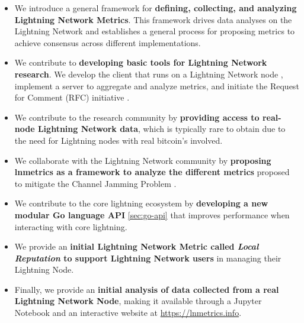 \begin{itemize}
  \item We introduce a general framework for \textbf{defining, collecting, and analyzing Lightning Network Metrics}.
        This framework drives data analyses on the Lightning Network and establishes a general process for proposing metrics
        to achieve consensus across different implementations.
  \item We contribute to \textbf{developing basic tools for Lightning Network research}. We develop the client that runs
        on a Lightning Network node \cite{lnmetrics-client}, implement a server \cite{lnmetrics-server} to aggregate and
        analyze metrics, and initiate the Request for Comment (RFC) initiative \cite{lnmetrics-rfc}.
  \item We contribute to the research community by \textbf{providing access to real-node Lightning Network data},
        which is typically rare to obtain due to the need for Lightning nodes with real bitcoin's involved.
  \item We collaborate with the Lightning Network community \cite{lightning-network-ml-post-on-jamming} by \textbf{proposing
        lnmetrics as a framework to analyze the different metrics} proposed to mitigate the Channel Jamming Problem \cite{cryptoeprint:2022/1454}.
  \item We contribute to the core lightning ecosystem by \textbf{developing a new modular Go language API} \ref{sec:go-api}
        that improves performance when interacting with core lightning.
  \item We provide an \textbf{initial Lightning Network Metric called \emph{Local Reputation} \cite{lnmetrics_localreputation}
        to support Lightning Network users} in managing their Lightning Node.
  \item Finally, we provide an \textbf{initial analysis of data collected from a real Lightning Network Node}, making it available
        through a Jupyter Notebook \cite{lnmetrics-jupyter} and an interactive website at \url{https://lnmetrics.info}.
\end{itemize}
